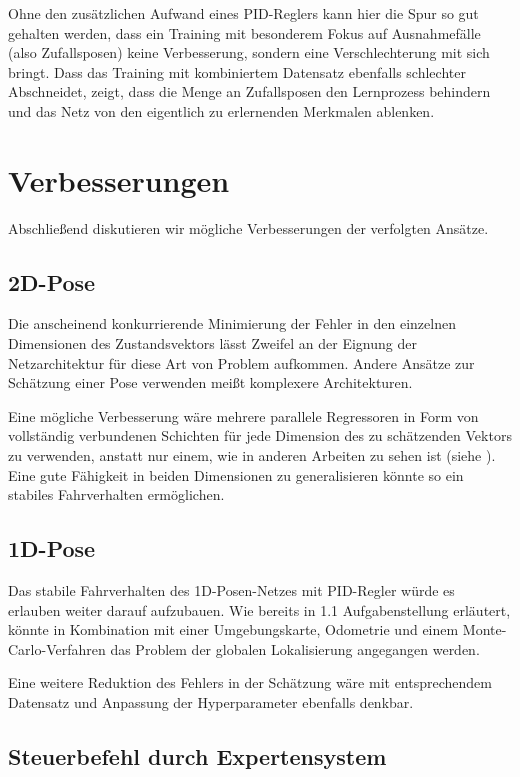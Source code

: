 Ohne den zusätzlichen Aufwand eines PID-Reglers kann hier die Spur so gut gehalten werden, dass ein Training mit besonderem Fokus auf Ausnahmefälle (also Zufallsposen) keine Verbesserung, sondern eine Verschlechterung mit sich bringt. Dass das Training mit kombiniertem Datensatz ebenfalls schlechter Abschneidet, zeigt, dass die Menge an Zufallsposen den Lernprozess behindern und das Netz von den eigentlich zu erlernenden Merkmalen ablenken.

\newpage
\section{Verbesserungen}

Abschließend diskutieren wir mögliche Verbesserungen der verfolgten Ansätze.

\subsection{2D-Pose}

Die anscheinend konkurrierende Minimierung der Fehler in den einzelnen Dimensionen des Zustandsvektors lässt Zweifel an der Eignung der Netzarchitektur für diese Art von Problem aufkommen. Andere Ansätze zur Schätzung einer Pose verwenden meißt komplexere Architekturen.

Eine mögliche Verbesserung wäre mehrere parallele Regressoren in Form von vollständig verbundenen Schichten für jede Dimension des zu schätzenden Vektors zu verwenden, anstatt nur einem, wie in anderen Arbeiten zu sehen ist (siehe \cite{camposeestimation}). Eine gute Fähigkeit in beiden Dimensionen zu generalisieren könnte so ein stabiles Fahrverhalten ermöglichen.

\subsection{1D-Pose}

Das stabile Fahrverhalten des 1D-Posen-Netzes mit PID-Regler würde es erlauben weiter darauf aufzubauen. Wie bereits in 1.1 Aufgabenstellung erläutert, könnte in Kombination mit einer Umgebungskarte, Odometrie und einem Monte-Carlo-Verfahren das Problem der globalen Lokalisierung angegangen werden.

Eine weitere Reduktion des Fehlers in der Schätzung wäre mit entsprechendem Datensatz und Anpassung der Hyperparameter ebenfalls denkbar.

\subsection{Steuerbefehl durch Expertensystem}

